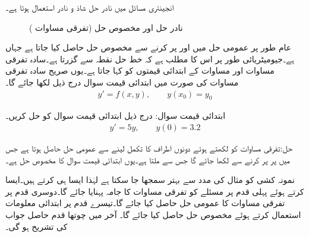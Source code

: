 انجینئری مسائل میں نادر حل شاذ و نادر استعمال ہوتا ہے۔ 
\begin{figure}
\centering
{}
\caption{نادر حل اور مخصوص حل (تفرقی مساوات )}
\label{شکل_ایک_درجی_نادر_مخصوص}
\end{figure}
عام طور پر عمومی حل میں   اور  پر کرنے سے مخصوص حل حاصل کیا جاتا ہے جہاں    ہے۔جیومیٹریائی طور پر اس کا مطلب ہے کہ خط حل نقطہ  سے گزرتا ہے۔سادہ تفرقی مساوات اور مساوات کے ابتدائی قیمتوں کو  کہا جاتا ہے۔یوں صریح سادہ تفرقی مساوات کی صورت میں ابتدائی قیمت سوال درج ذیل لکھا جائے گا۔
\begin{align}
y'=f(x,y), \quad \quad y(x_0)=y_0
\end{align}

ابتدائی قیمت سوال: درج ذیل ابتدائی قیمت سوال کو حل کریں۔
\begin{align*}
y'=5y,\quad \quad y(0)=3.2
\end{align*}

حل:تفرقی مساوات کو  لکھتے ہوئے دونوں اطراف کا تکمل لینے سے  عمومی حل حاصل ہوتا ہے جس میں  پر  پر کرنے سے  لکھا جائے گا جس سے  ملتا ہے۔یوں ابتدائی قیمت سوال کا مخصوص حل  ہے۔

نمونہ کشی کو مثال کی مدد سے بہتر سمجھا جا سکتا ہے لہٰذا ایسا ہی کرتے ہیں۔ایسا کرتے ہوئے پہلی قدم پر  مسئلے کو تفرقی مساوات کا جامہ پہنایا جائے گا۔دوسری قدم پر تفرقی مساوات کا عمومی حل حاصل کیا جائے گا۔تیسرے قدم پر ابتدائی معلومات استعمال کرتے ہوئے مخصوص حل حاصل کیا جائے گا۔ آخر میں چوتھا قدم حاصل جواب کی تشریح ہو گی۔ 

